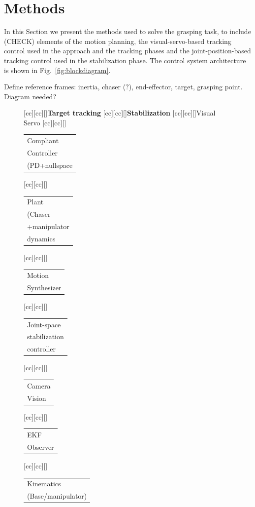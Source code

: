\section{Methods}
%
In this Section we present the methods used to solve the grasping task, to include (CHECK) elements of the motion planning, the visual-servo-based tracking control used in the approach and the tracking phases and the joint-position-based tracking control used in the stabilization phase. The control system architecture is shown in Fig.~\ref{fig:blockdiagram}.

Define reference frames: inertia, chaser (?), end-effector, target, grasping point. Diagram needed?
%
\begin{figure}
\centering  	\label{fig_1}
[cc][cc][\FontFigM]{\textbf{Target tracking}}
[cc][cc][\FontFigM]{\textbf{Stabilization}}
[cc][cc][\FontFigM]{Visual Servo}
[cc][cc][\FontFigM]{\small{\begin{tabular}{@{}l@{}} Compliant\\Controller\\(PD+nullspace\end{tabular}}}
[cc][cc][\FontFigM]{\small{\begin{tabular}{@{}l@{}} Plant\\(Chaser\\+manipulator\\dynamics\end{tabular}}}
[cc][cc][\FontFigM]{{\begin{tabular}{@{}l@{}} Motion\\Synthesizer \end{tabular}}}
[cc][cc][\FontFigM]{\small{\begin{tabular}{@{}l@{}} Joint-space\\stabilization\\controller \end{tabular}}}
[cc][cc][\FontFigM]{\small{\begin{tabular}{@{}l@{}} Camera\\Vision \end{tabular}}}
[cc][cc][\FontFigM]{\small{\begin{tabular}{@{}l@{}} EKF\\Observer \end{tabular}}}
[cc][cc][\FontFigM]{\small{\begin{tabular}{@{}l@{}} Kinematics\\(Base/manipulator) \end{tabular}}}

\end{figure}
